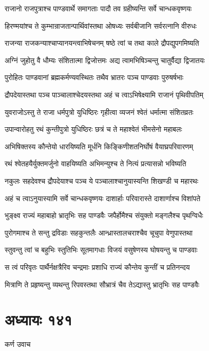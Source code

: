 \twolineshloka
{राजानो राजपुत्राश्च पाण्डवार्थे समागताः}
{पादौ तव ग्रहीष्यन्ति सर्वे चान्धकवृष्णयः}


\twolineshloka
{हिरण्मयांश्च ते कुम्भान्राजतान्पार्थिवांस्तथा}
{ओषध्यः सर्वबीजानि सर्वरत्नानि वीरुधः}


\twolineshloka
{राजन्या राजकन्याश्चाप्यानयन्त्वाभिषेचनम्}
{षष्ठे त्वां च तथा काले द्रौपद्युपगमिष्यति}


\twolineshloka
{अग्निं जुहोतु वै धौम्यः संशितात्मा द्विजोत्तमः}
{अद्य त्वामभिषिञ्चन्तु चातुर्वैद्या द्विजातयः}


\twolineshloka
{पुरोहितः पाण्डवानां ब्रह्मकर्मण्यवस्थितः}
{तथैव भ्रातरः पञ्च पाण्डवाः पुरुषर्षभाः}


\twolineshloka
{द्रौपदेयास्तथा पञ्च पाञ्चालाश्चेदयस्तथा}
{अहं च त्वाऽभिषेक्ष्यामि राजानं पृथिवीपतिम्}


\threelineshloka
{युवराजोऽस्तु ते राजा धर्मपुत्रो युधिष्ठिरः}
{गृहीत्वा व्यजनं श्वेतं धर्मात्मा संशितव्रतः}
{}


\twolineshloka
{उपान्वारोहतु रथं कुन्तीपुत्रो युधिष्ठिरः}
{छत्रं च ते महाश्वेतं भीमसेनो महाबलः}


\twolineshloka
{अभिषिक्तस्य कौन्तेयो धारयिष्यति मूर्धनि}
{किङ्किणीशतनिर्घोषं वैयाघ्रपरिवारणम्}


\twolineshloka
{रथं श्वेतहयैर्युक्तमर्जुनो वाहयिष्यति}
{अभिमन्युश्च ते नित्यं प्रत्यासन्नो भविष्यति}


\threelineshloka
{नकुलः सहदेवश्च द्रौपदेयाश्च पञ्च ये}
{पञ्चालाश्चानुयास्यन्ति शिखण्डी च महारथः}
{}


\twolineshloka
{अहं च त्वाऽनुयास्यामि सर्वे चान्धकवृष्णयः}
{दाशार्हाः परिवारास्ते दाशार्णाश्च विशांपते}


\twolineshloka
{भुङ्क्ष्व राज्यं महाबाहो भ्रातृभिः सह पाण्डवैः}
{जपैर्होमैश्च संयुक्तो मङ्गलैश्च पृथग्विधैः}


\twolineshloka
{पुरोगमाश्च ते सन्तु द्रविडाः सहकुन्तलैः}
{आन्ध्रास्तालचराश्चैव चूचुपा वेणुपास्तथा}


\twolineshloka
{स्तुवन्तु त्वां च बहुभिः स्तुतिभिः सूतमागधाः}
{विजयं वसुषेणस्य घोषयन्तु च पाण्डवाः}


\twolineshloka
{स त्वं परिवृतः पार्थैर्नक्षत्रैरिव चन्द्रमाः}
{प्रशाधि राज्यं कौन्तेय कुन्तीं च प्रतिनन्दय}


\twolineshloka
{मित्राणि ते प्रहृष्यन्तु व्यथन्तु रिपवस्तथा}
{सौभ्रात्रं चैव तेऽद्यास्तु भ्रातृभिः सह पाण्डवैः}


\chapter{अध्यायः १४१}
\twolineshloka
{कर्ण उवाच}
{}


